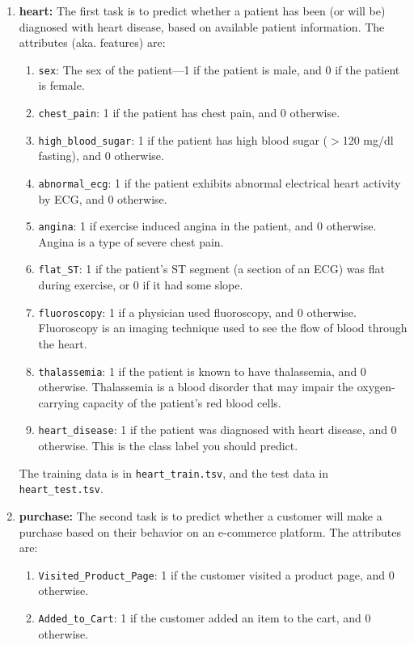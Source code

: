 \documentclass[11pt,addpoints,answers]{exam}
\begin{document}
\begin{enumerate}
\item \textbf{heart:}
    The first task is to predict whether a patient has been (or will be) diagnosed with heart disease, based on available patient information. The attributes (aka. features) are: 
    \begin{enumerate}
        \item \lstinline{sex}: The sex of the patient---1 if the patient is male, and 0 if the patient is female.
        \item \lstinline{chest_pain}: 1 if the patient has chest pain, and 0 otherwise.
        \item \lstinline{high_blood_sugar}: 1 if the patient has high blood sugar ($>$120 mg/dl fasting), and 0 otherwise.
        \item \lstinline{abnormal_ecg}: 1 if the patient exhibits abnormal electrical heart activity by ECG, and 0 otherwise.
        \item \lstinline{angina}: 1 if exercise induced angina in the patient, and 0 otherwise. Angina is a type of severe chest pain.
        \item \lstinline{flat_ST}: 1 if the patient's ST segment (a section of an ECG) was flat during exercise, or 0 if it had some slope.
        \item \lstinline{fluoroscopy}: 1 if a physician used fluoroscopy, and 0 otherwise. Fluoroscopy is an imaging technique used to see the flow of blood through the heart.
        \item \lstinline{thalassemia}: 1 if the patient is known to have thalassemia, and 0 otherwise. Thalassemia is a blood disorder that may impair the oxygen-carrying capacity of the patient's red blood cells.
        \item \lstinline{heart_disease}: 1 if the patient was diagnosed with heart disease, and 0 otherwise. This is the class label you should predict.
    \end{enumerate}
    The training data is in \lstinline{heart_train.tsv}, and the test data in \lstinline{heart_test.tsv}.
\item \textbf{purchase:}
    The second task is to predict whether a customer will make a purchase based on their behavior on an e-commerce platform. The attributes are: 
    \begin{enumerate}
        \item \lstinline{Visited_Product_Page}: 1 if the customer visited a product page, and 0 otherwise.
        \item \lstinline{Added_to_Cart}: 1 if the customer added an item to the cart, and 0 otherwise. 

\end{enumerate}
\end{enumerate}
\end{document}
